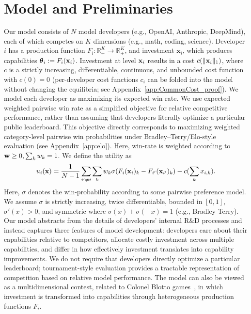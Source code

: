 \section{Model and Preliminaries}
\label{sec:model}
Our model consists of $N$ model developers (e.g., OpenAI, Anthropic, DeepMind), each of which competes on $K$ dimensions (e.g., math, coding, science). 
Developer $i$ has a production function $F_{i}: \mathbb{R}_{+}^{K} \rightarrow \mathbb{R}_{+}^{K}$, and investment $\mathbf{x}_i$, which produces capabilities $\boldsymbol{\theta}_i := F_i(\mathbf{x}_i)$. 
Investment at level $\mathbf{x}_i$ results in a cost $c(\lVert \mathbf{x}_i\rVert_1)$, where $c$ is a strictly increasing, differentiable, continuous, and unbounded cost function with $c(0) = 0$ (per-developer cost functions $c_i$ can be folded into the model without changing the equilibria; see Appendix~\ref{app:CommonCost_proof}). 
We model each developer as maximizing its expected win rate.
We use expected weighted pairwise win rate as a simplified objective for relative competitive performance, rather than assuming that developers literally optimize a particular public leaderboard.
This objective directly corresponds to maximizing weighted category-level pairwise win probabilities under Bradley–Terry/Elo-style evaluation (see Appendix~\ref{app:elo}). 
Here, win-rate is weighted according to $\mathbf{w} \geq 0, \sum_{k} w_{k} = 1$.
We define the utility as 
\begin{equation}
\label{eq:utility}
u_{i}(\mathbf{x}) = \frac{1}{N-1} \sum_{i' \neq i} \sum_{k} w_{k} \sigma(F_i(\mathbf{x}_i)_k - F_{i'}(\mathbf{x}_{i'})_k)- c(\sum_{k} x_{i,k}).
\end{equation}
Here, $\sigma$ denotes the win-probability according to some pairwise preference model. 
We assume $\sigma$ is strictly increasing, twice differentiable, bounded in $[0,1]$, $\sigma'(x)>0$, and symmetric where $\sigma(x)+\sigma(-x)=1$ (e.g., Bradley-Terry).
Our model abstracts from the details of developers' internal R\&D processes and instead captures three features of model development: developers care about their capabilities relative to competitors, allocate costly investment across multiple capabilities, and differ in how effectively investment translates into capability improvements. 
We do not require that developers directly optimize a particular leaderboard; tournament-style evaluation provides a tractable representation of competition based on relative model performance. 
The model can also be viewed as a multidimensional contest, related to Colonel Blotto games~\citep{colonel_blotto}, in which investment is transformed into capabilities through heterogeneous production functions \(F_i\).

